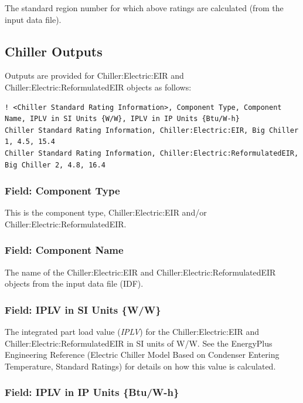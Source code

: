 The standard region number for which above ratings are calculated (from the input data file).

\subsection{Chiller Outputs}\label{chiller-outputs}

Outputs are provided for Chiller:Electric:EIR and Chiller:Electric:ReformulatedEIR objects as follows:

\begin{lstlisting}
! <Chiller Standard Rating Information>, Component Type, Component Name, IPLV in SI Units {W/W}, IPLV in IP Units {Btu/W-h}
Chiller Standard Rating Information, Chiller:Electric:EIR, Big Chiller 1, 4.5, 15.4
Chiller Standard Rating Information, Chiller:Electric:ReformulatedEIR, Big Chiller 2, 4.8, 16.4
\end{lstlisting}

\subsubsection{Field: Component Type}\label{field-component-type-6}

This is the component type, Chiller:Electric:EIR and/or Chiller:Electric:ReformulatedEIR.

\subsubsection{Field: Component Name}\label{field-component-name-6}

The name of the Chiller:Electric:EIR and Chiller:Electric:ReformulatedEIR objects from the input data file (IDF).

\subsubsection{Field: IPLV in SI Units \{W/W\}}\label{field-iplv-in-si-units-ww}

The integrated part load value (\emph{IPLV}) for the Chiller:Electric:EIR and Chiller:Electric:ReformulatedEIR in SI units of W/W. See the EnergyPlus Engineering Reference (Electric Chiller Model Based on Condenser Entering Temperature, Standard Ratings) for details on how this value is calculated.

\subsubsection{Field: IPLV in IP Units \{Btu/W-h\}}\label{field-iplv-in-ip-units-btuw-h}

